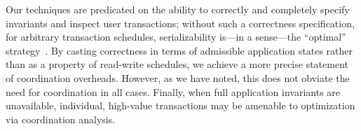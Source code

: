  Our techniques are predicated
on the ability to correctly and completely specify invariants and
inspect user transactions; without such a correctness specification,
for arbitrary transaction schedules, serializability is---in a
sense---the ``optimal'' strategy~\cite{kung1979optimality}. By casting
correctness in terms of admissible application states rather than as a
property of read-write schedules, we achieve a more precise statement
of coordination overheads. However, as we have noted, this does not
obviate the need for coordination in all cases. Finally, when full
application invariants are unavailable, individual, high-value
transactions may be amenable to optimization via \iconfluence
coordination analysis.
